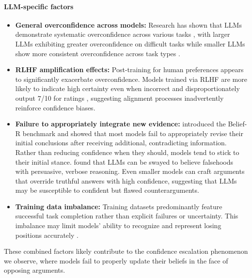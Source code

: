 \documentclass{article}
\begin{document}
\paragraph{LLM-specific factors}
\begin{itemize}
    \item \textbf{General overconfidence across models:} Research has shown that LLMs demonstrate systematic overconfidence across various tasks \citep{chhikara2025mindconfidencegapoverconfidence,xiong2024uncertainty}, with larger LLMs exhibiting greater overconfidence on difficult tasks while smaller LLMs show more consistent overconfidence across task types \citep{wen2024from}.

    \item \textbf{RLHF amplification effects:} Post-training for human preferences appears to significantly exacerbate overconfidence. Models trained via RLHF are more likely to indicate high certainty even when incorrect \citep{leng2025tamingoverconfidencellmsreward} and disproportionately output 7/10 for ratings \citep{west2025basemodelsbeataligned,openai2024gpt4technicalreport}, suggesting alignment processes inadvertently reinforce confidence biases.

    \item \textbf{Failure to appropriately integrate new evidence:} \citet{wilie2024beliefrevisionadaptabilitylarge} introduced the Belief-R benchmark and showed that most models fail to appropriately revise their initial conclusions after receiving additional, contradicting information. Rather than reducing confidence when they should, models tend to stick to their initial stance. \citet{agarwal2025persuasionoverridestruthmultiagent} found that LLMs can be swayed to believe falsehoods with persuasive, verbose reasoning. Even smaller models can craft arguments that override truthful answers with high confidence, suggesting that LLMs may be susceptible to confident but flawed counterarguments.

    \item \textbf{Training data imbalance:} Training datasets predominantly feature successful task completion rather than explicit failures or uncertainty. This imbalance may limit models' ability to recognize and represent losing positions accurately \citep{zhou2023navigatinggreyareaexpressions}.
\end{itemize}

These combined factors likely contribute to the confidence escalation phenomenon we observe, where models fail to properly update their beliefs in the face of opposing arguments.
\end{document}

